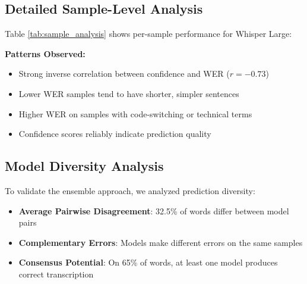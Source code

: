 \subsection{Detailed Sample-Level Analysis}

Table \ref{tab:sample_analysis} shows per-sample performance for Whisper Large:

\begin{table}[H]
\centering
\caption{Sample-Level Analysis: Whisper Large Performance}
\label{tab:sample_analysis}
\end{table}

\textbf{Patterns Observed:}

\begin{itemize}
    \item Strong inverse correlation between confidence and WER ($r = -0.73$)
    \item Lower WER samples tend to have shorter, simpler sentences
    \item Higher WER on samples with code-switching or technical terms
    \item Confidence scores reliably indicate prediction quality
\end{itemize}

\subsection{Model Diversity Analysis}

To validate the ensemble approach, we analyzed prediction diversity:

\begin{itemize}
    \item \textbf{Average Pairwise Disagreement}: 32.5\% of words differ between model pairs
    \item \textbf{Complementary Errors}: Models make different errors on the same samples
    \item \textbf{Consensus Potential}: On 65\% of words, at least one model produces correct transcription
\end{itemize}

